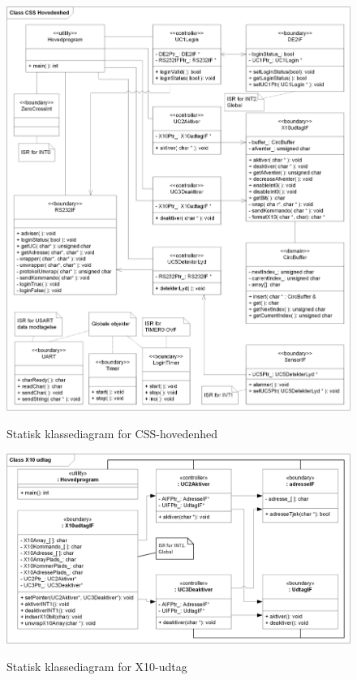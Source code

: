 \begin{figure}[htb]
  \centering
  {
    \includegraphics[width=\textwidth]	
      {billeder/uml/CSS_hovedenhed_Class_Static}
  }
  \caption{Statisk klassediagram for CSS-hovedenhed}
  \label{fig:CSS_hovedenhed_class_static}
\end{figure}

\begin{figure}[htb]
  \centering
  {
    \includegraphics[width=\textwidth]	
      {billeder/uml/X10_modtager_Class_Static}
  }
  \caption{Statisk klassediagram for X10-udtag}
  \label{fig:X10_modtager_Class_Static}
\end{figure}
